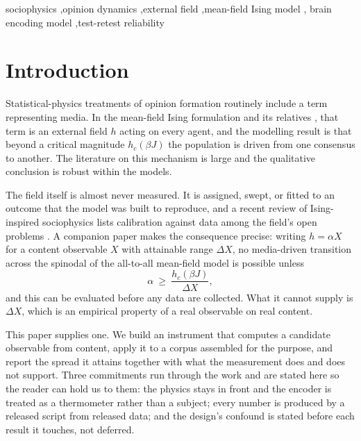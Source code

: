 \documentclass[preprint,12pt]{elsarticle}
\begin{document}
\begin{frontmatter}
\begin{keyword}
sociophysics \sep opinion dynamics \sep external field \sep mean-field Ising model \sep
brain encoding model \sep test-retest reliability
\end{keyword}

\end{frontmatter}

\section{Introduction}
\label{sec:intro}

Statistical-physics treatments of opinion formation routinely include a term representing
media. In the mean-field Ising formulation and its relatives \cite{castellano2009,galam2008},
that term is an external field $h$ acting on every agent, and the modelling result is that
beyond a critical magnitude $h_c(\beta J)$ the population is driven from one consensus to
another. The literature on this mechanism is large
\cite{crokidakis2012,azhari2023,freitas2020,sirbu2016} and the qualitative conclusion is
robust within the models.

The field itself is almost never measured. It is assigned, swept, or fitted to an outcome
that the model was built to reproduce, and a recent review of Ising-inspired sociophysics
lists calibration against data among the field's open problems \cite{mullick2025}. A
companion paper \cite{mwai_bound} makes the consequence precise: writing $h = \alpha X$ for
a content observable $X$ with attainable range $\Delta X$, no media-driven transition across
the spinodal of the all-to-all mean-field model is possible unless
\begin{equation}
\label{eq:bound}
\alpha \ \ge\ \frac{h_c(\beta J)}{\Delta X},
\end{equation}
and this can be evaluated before any data are collected. What it cannot supply is
$\Delta X$, which is an empirical property of a real observable on real content.

This paper supplies one. We build an instrument that computes a candidate observable from
content, apply it to a corpus assembled for the purpose, and report the spread it attains
together with what the measurement does and does not support. Three commitments run through
the work and are stated here so the reader can hold us to them: the physics stays in front
and the encoder is treated as a thermometer rather than a subject; every number is produced
by a released script from released data; and the design's confound is stated before each
result it touches, not deferred.
\end{document}
